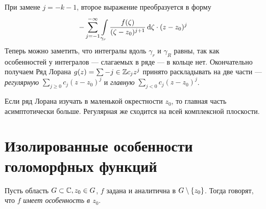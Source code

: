 \documentclass[a4paper]{report}
\begin{document}
{{    При замене $j = -k - 1$, второе выражение преобразуется в форму
    \[-\sum\limits_{j = -1}^{-\infty}\int\limits_{\gamma_r}\frac{f(\zeta)}{(\zeta - z_0)^{j+1}}\operatorname{d}\!\zeta\cdot (z - z_0)^j\]
    Теперь можно заметить, что интегралы вдоль $\gamma_r$ и $\gamma_R$ равны, так как особенностей у интегралов --- слагаемых в ряде --- в кольце нет. Окончательно получаем
    }
    }
    Ряд Лорана $g(z) = \sum\limits-{j \in \mathbb{Z}}c_jz^j$ принято раскладывать на две части --- \emph{регулярную} $\sum\limits_{j \ge 0}c_j (z - z_0)^j$ и \emph{главную} $\sum\limits_{j < 0} c_j (z - z_0)^j$.

    Если ряд Лорана изучать в маленькой окрестности $z_0$, то главная часть асимптотически больше.
    Регулярная же сходится на всей комплексной плоскости.
    \section{Изолированные особенности голоморфных функций}
    Пусть область $G \subset \mathbb{C}, z_0 \in G$, $f$ задана и аналитична в $G \setminus \{z_0\}$.
    Тогда говорят, что $f$ \emph{имеет особенность в $z_0$}.
\end{document}
